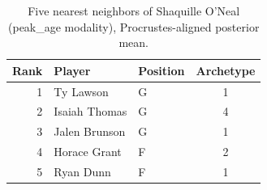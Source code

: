 \begin{table}[htbp]
  \centering\small
  \begin{tabular}{rllc}
    \toprule
    Rank & Player & Position & Archetype \\
    \midrule
    1 & Ty Lawson & G & 1 \\
    2 & Isaiah Thomas & G & 4 \\
    3 & Jalen Brunson & G & 1 \\
    4 & Horace Grant & F & 2 \\
    5 & Ryan Dunn & F & 1 \\
    \bottomrule
  \end{tabular}
  \caption{Five nearest neighbors of Shaquille O'Neal (peak_age modality), Procrustes-aligned posterior mean.}
  \label{tab:Shaquille_O_Neal_neighbors_peak_age}
\end{table}

